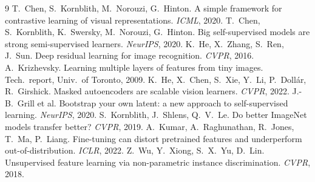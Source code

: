 \documentclass[10pt,a4paper]{article}
\begin{document}
\small
\begin{thebibliography}{9}\setlength{\itemsep}{0pt}
 T.~Chen, S.~Kornblith, M.~Norouzi, G.~Hinton. A simple framework for contrastive learning of visual representations. \emph{ICML}, 2020.
 T.~Chen, S.~Kornblith, K.~Swersky, M.~Norouzi, G.~Hinton. Big self-supervised models are strong semi-supervised learners. \emph{NeurIPS}, 2020.
 K.~He, X.~Zhang, S.~Ren, J.~Sun. Deep residual learning for image recognition. \emph{CVPR}, 2016.
 A.~Krizhevsky. Learning multiple layers of features from tiny images. Tech.\ report, Univ.\ of Toronto, 2009.
 K.~He, X.~Chen, S.~Xie, Y.~Li, P.~Doll\'ar, R.~Girshick. Masked autoencoders are scalable vision learners. \emph{CVPR}, 2022.
 J.-B.~Grill et al. Bootstrap your own latent: a new approach to self-supervised learning. \emph{NeurIPS}, 2020.
 S.~Kornblith, J.~Shlens, Q.~V.~Le. Do better ImageNet models transfer better? \emph{CVPR}, 2019.
 A.~Kumar, A.~Raghunathan, R.~Jones, T.~Ma, P.~Liang. Fine-tuning can distort pretrained features and underperform out-of-distribution. \emph{ICLR}, 2022.
Z.~Wu, Y.~Xiong, S.~X.~Yu, D.~Lin. Unsupervised feature learning via non-parametric instance discrimination. \emph{CVPR}, 2018.
\end{thebibliography}
\end{document}
